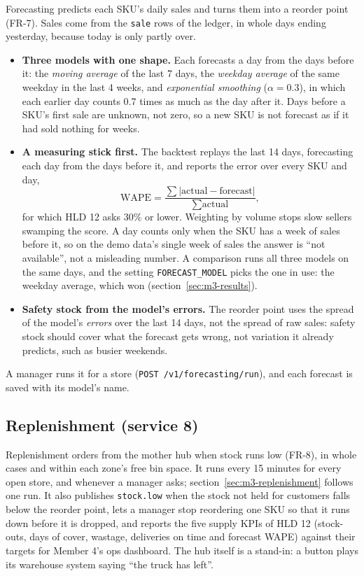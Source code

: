 Forecasting predicts each SKU's daily sales and turns them into a reorder point (FR-7). Sales come from the
\texttt{sale} rows of the ledger, in whole days ending yesterday, because today is only partly over.

\begin{itemize}
  \item \textbf{Three models with one shape.} Each forecasts a day from the days before it: the \emph{moving average}
    of the last 7 days, the \emph{weekday average} of the same weekday in the last 4 weeks, and \emph{exponential
    smoothing} ($\alpha = 0.3$), in which each earlier day counts 0.7 times as much as the day after it. Days before a
    SKU's first sale are unknown, not zero, so a new SKU is not forecast as if it had sold nothing for weeks.
  \item \textbf{A measuring stick first.} The backtest replays the last 14 days, forecasting each day from the days
    before it, and reports the error over every SKU and day,
    \[ \mathrm{WAPE} = \frac{\sum |\textrm{actual} - \textrm{forecast}|}{\sum \textrm{actual}}, \]
    for which HLD 12 asks 30\% or lower. Weighting by volume stops slow sellers swamping the score. A day counts only
    when the SKU has a week of sales before it, so on the demo data's single week of sales the answer is ``not
    available'', not a misleading number. A comparison runs all three models on the same days, and the setting
    \texttt{FORECAST\_MODEL} picks the one in use: the weekday average, which won (section~\ref{sec:m3-results}).
  \item \textbf{Safety stock from the model's errors.} The reorder point uses the spread of the model's \emph{errors}
    over the last 14 days, not the spread of raw sales: safety stock should cover what the forecast gets wrong, not
    variation it already predicts, such as busier weekends.
\end{itemize}
A manager runs it for a store (\texttt{POST /v1/forecasting/run}), and each forecast is saved with its model's name.

\subsection{Replenishment (service 8)}

Replenishment orders from the mother hub when stock runs low (FR-8), in whole cases and within each zone's free bin
space. It runs every 15 minutes for every open store, and whenever a manager asks; section~\ref{sec:m3-replenishment}
follows one run. It also publishes \texttt{stock.low} when the stock not held for customers falls below the reorder point, lets
a manager stop reordering one SKU so that it runs down before it is dropped, and reports the five supply KPIs of HLD 12
(stock-outs, days of cover, wastage, deliveries on time and forecast WAPE) against their targets for Member 4's ops
dashboard. The hub itself is a stand-in: a button plays its warehouse system saying ``the truck has left''.

